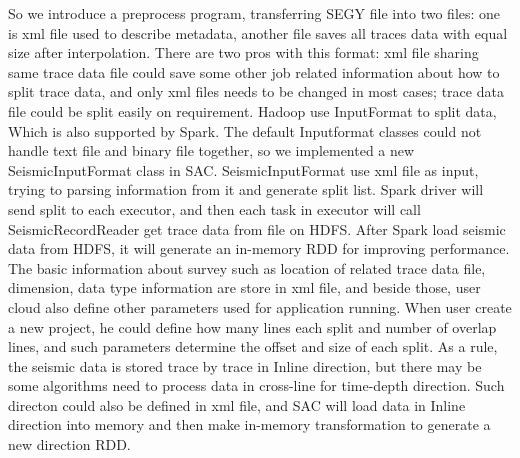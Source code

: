So we introduce a preprocess program, transferring SEGY file into two files: one is xml file used to describe metadata, another file saves all traces data with equal size after interpolation. There are two pros with this format: xml file sharing same trace data file could save some other job related information about how to split trace data, and only xml files needs to be changed in most cases; trace data file could be split easily on requirement. Hadoop use InputFormat to split data, Which is also supported by Spark. The default Inputformat classes could not handle text file and binary file together, so we implemented a new SeismicInputFormat class in SAC. SeismicInputFormat use xml file as input, trying to parsing information from it and generate split list. Spark driver will send split to each executor, and then each task in executor will call SeismicRecordReader get trace data from file on HDFS. After Spark load seismic data from HDFS, it will generate an in-memory RDD for improving performance. The basic information about survey such as location of related trace data file, dimension, data type information are store in xml file, and beside those, user cloud also define other parameters used for application running. When user create a new project, he could define how many lines each split and number of overlap lines, and such parameters determine the offset and size of each split. As a rule, the seismic data is stored trace by trace in Inline direction, but there may be some algorithms need to process data in cross-line for time-depth direction. Such directon could also be defined in xml file, and SAC will load data in Inline direction into memory and then make in-memory transformation to generate a new direction RDD.
  

